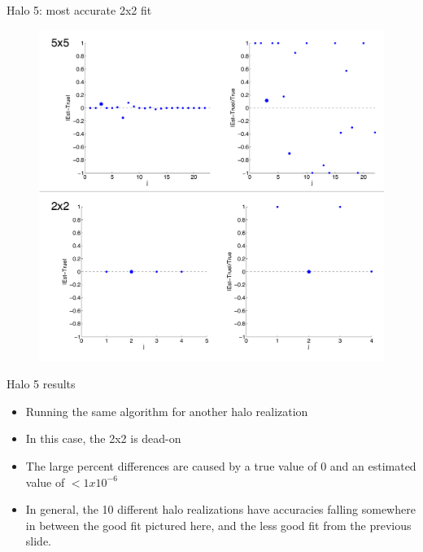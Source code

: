 \documentclass{beamer}
\begin{document}
\begin{frame}{Halo 5: most accurate 2x2 fit}
	
	\begin{figure}
			\begin{center}
				\includegraphics[scale=0.22]{halo5pct2x25x5.pdf}
			\end{center}
	\end{figure}	
	
\end{frame}
\begin{frame}[shrink]{Halo 5 results}
	
	\begin{itemize}
		\item Running the same algorithm for another halo realization
		\item In this case, the 2x2 is dead-on
		\item The large percent differences are caused by a true value of 0 and an estimated value of $< 1 x 10^{-6}$
		\item In general, the 10 different halo realizations have accuracies falling somewhere in between the good fit pictured here, and the less good fit from the previous slide.

	\end{itemize}
	
\end{frame}
\end{document}
